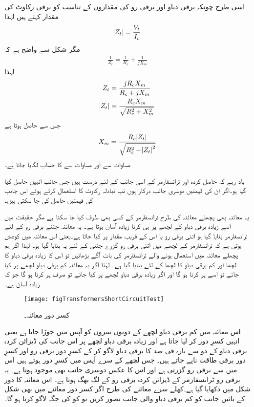 اسی طرح چونکہ برقی دباو اور برقی رو کی مقداروں کے تناسب کو برقی رکاوٹ کی مقدار کہتے ہیں لہٰذا
\begin{align*}
\abs{Z_t}=\frac{V_t}{I_t}
\end{align*}
مگر شکل   سے واضح ہے کہ
\begin{align*}
\frac{1}{Z_t}=\frac{1}{R_c}+\frac{1}{j X_m}
\end{align*}
لہٰذا
\begin{align*}
Z_t&=\frac{j R_c X_m}{R_c+j X_m}\\
\abs{Z_t}&=\frac{R_c X_m}{\sqrt{R_c^2+X_m^2}}
\end{align*}
جس سے حاصل ہوتا ہے
\begin{align}\label{مساوات_ٹرانسفارمر_کھلے_دور_امالہ_حاصل}
X_m=\frac{R_c \abs{Z_t}}{\sqrt{R_c^2-\abs{Z_t}^2}}
\end{align}
مساوات   سے  اور  مساوات   سے    کا حساب لگایا جاتا ہے۔

یاد رہے کہ حاصل کردہ  اور  ٹرانسفارمر کے اسی جانب کے لئے درست ہیں جس جانب انہیں حاصل کیا گیا ہو۔اگر ان کی قیمتیں دوسری جانب درکار ہوں تب تبادلہ رکاوٹ کا استعمال کرتے ہوئے اس جانب کی قیمتیں حاصل کی جا سکتی ہیں۔ 

یہ معائنہ بھی پچھلے معائنہ کی طرح ٹرانسفارمر کے کسی بھی طرف کیا جا سکتا ہے مگر حقیقت میں اسے زیادہ برقی دباو کے لچھے پر ہی کرنا زیادہ آسان ہوتا ہے۔ یہ معائنہ جتنے برقی رو کے لئے ٹرانسفارمر بنایا گیا ہو اتنی برقی رو یا اس کے قریب مقدار پر کیا جاتا ہے۔یعنی اس معائنہ میں کوشش ہوتی ہے کہ ٹرانسفارمر کے لچھے میں اتنی برقی رو گزرے جتنی کے لئے یہ بنایا گیا ہو۔ لہٰذا اگر ہم پچھلے معائنہ میں استعمال ہونے والے ٹرانسفارمر کی بات آگے بڑھائیں تو اس کا زیادہ برقی دباو کا لچھا  اور کم برقی دباو کا لچھا  کے لئے بنایا گیا ہے۔ لہٰذا اگر یہ معائنہ کم برقی دباو لچھے پر کیا جائے تو اسے   پر  کرنا ہو گا اور اگر زیادہ برقی دباو لچھے پر کیا جائے تو صرف  پر کرنا ہو گا جو کہ زیادہ آسان ہے۔
\begin{figure}
\centering
\texttt{[image: figTransformersShortCircuitTest]}
\caption{کسر دور معائنہ۔}
\label{شکل_ٹرانسفارمر_کسر_دور_معائنہ}
\end{figure}

اس معائنہ میں کم برقی دباو لچھے کے دونوں سروں کو آپس میں جوڑا جاتا ہے یعنی انہیں کسرِ دور کر لیا جاتا ہے اور زیادہ برقی دباو لچھے پر اس جانب کی ڈیزائن کردہ برقی دباو کے دو سے بارہ  فی صد کا برقی دباو  لاگو کر کے کسرِ دور برقی رو  اور کسرِ دور برقی طاقت  ناپے جاتے ہیں۔ جس لچھے کے سرے آپس میں کسرِ دور ہوتے ہیں اس میں سے برقی رو گزرتی ہے اور اس کا عکس دوسری جانب بھی موجود ہوتا ہے۔ یہ برقی رو ٹرانسفارمر کے ڈیزائن کردہ برقی رو کے لگ بھگ ہوتا ہے۔ اس معائنہ کا دور شکل  میں دکھایا گیا ہے۔کھلے سرے معائنے کی طرح اگر کسر دور معائنے میں بھی  شکل  کے بائیں جانب کو کم برقی دباو والی جانب تصور کریں تو   کو   کی جگہ لاگو کرنا ہو گا۔

